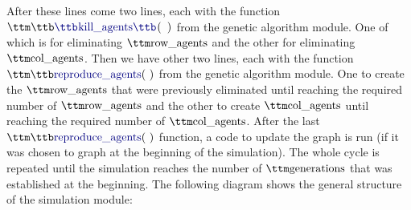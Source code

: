 After these lines come two lines, each with the function $\pythoninline{kill\_agents( )}$ from the genetic algorithm module. One of which is for eliminating $\pythoninline{row\_agents}$ and the other for eliminating $\pythoninline{col\_agents}$.  
Then we have other two lines, each with the function $\pythoninline{reproduce\_agents( )}$ from the genetic algorithm module. One to create the $\pythoninline{row\_agents}$ that were previously eliminated until reaching the required number of $\pythoninline{row\_agents}$ and the other to create $\pythoninline{col\_agents}$ until reaching the required number of $\pythoninline{col\_agents}$. 
After the last $\pythoninline{reproduce\_agents( )}$ function, a code to update the graph is run (if it was chosen to graph at the beginning of the simulation). 
The whole cycle is repeated until the simulation reaches the number of $\pythoninline{generations}$ that was established at the beginning. The following diagram shows the general structure of the simulation module:

